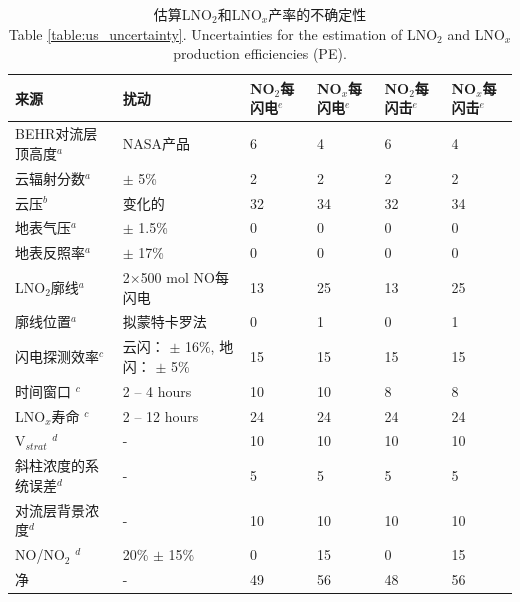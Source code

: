 \begin{table}[H]
\centering
\caption{估算LNO$_2$和LNO$_x$产率的不确定性\\ Table \ref{table:us_uncertainty}. Uncertainties for the estimation of LNO$_2$ and LNO$_x$ production efficiencies (PE).}
\scriptsize
\begin{tabular}{llllll}
\hline
来源 & 扰动 & NO$_2$每闪电$^e$ & NO$_x$每闪电$^e$ & NO$_2$每闪击$^e$ & NO$_x$每闪击$^e$ \\
\hline
BEHR对流层顶高度$^a$                    & NASA产品                              & 6   & 4   & 6   & 4 \\
云辐射分数$^a$                          & $\pm$ 5\%                            & 2   & 2   & 2   & 2 \\
云压$^b$                               & 变化的                                & 32  & 34  & 32  & 34 \\
地表气压$^a$                            & $\pm$ 1.5\%                          & 0   & 0   & 0   & 0 \\
地表反照率$^a$                          & $\pm$ 17\%                           & 0   & 0   & 0   & 0 \\
LNO$_2$廓线$^a$               & 2$\times$500 mol NO每闪电             & 13  & 25  & 13  & 25 \\
廓线位置$^a$                            & 拟蒙特卡罗法                           & 0   & 1   & 0   & 1 \\
闪电探测效率$^c$                        & 云闪： $\pm$ 16\%, 地闪： $\pm$ 5\%        & 15  & 15  & 15  & 15 \\
时间窗口%
$^c$                                  & 2 -- 4 hours                         & 10  & 10  & 8   & 8 \\
LNO$_x$寿命%
$^c$                                  & 2 -- 12 hours                        & 24  & 24  & 24  & 24 \\
V$_{strat}$%
$^d$                                  & -                                    & 10  & 10  & 10  & 10 \\
斜柱浓度的系统误差$^d$                   & -                                    & 5   & 5   & 5   & 5 \\
对流层背景浓度$^d$           & -                                    & 10  & 10  & 10  & 10  \\
NO/NO$_2$%
$^d$                                  & 20\% $\pm$ 15\%                      & 0   & 15  & 0   & 15 \\
净                                   & -                                    & 49  & 56  & 48  & 56 \\

\end{tabular}
\end{table}

